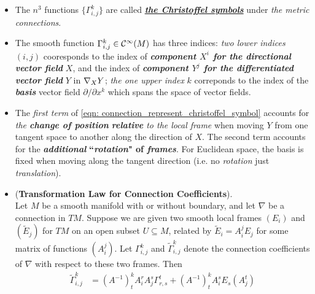 \documentclass[11pt]{article}
\begin{document}
\begin{itemize}
\item \begin{remark}
The $n^3$ functions $\{\Gamma_{i,j}^{k}\}$ are called \underline{\emph{\textbf{the Christoffel symbols}}} under \emph{the metric connections}. \citep{do1976differential}
\end{remark}

\item \begin{remark}
The smooth function $\Gamma_{i,j}^{k} \in {\mathcal C}^{\infty}(M)$ has three indices: \emph{two lower indices} $(i,j)$ cooresponds to the index of \emph{\textbf{component $X^i$ for the directional vector field}} $X$, and the index of \emph{\textbf{component $Y^j$ for the differentiated vector field}} $Y$ in $\nabla_{X}{Y}$;  \emph{the one upper index} $k$ correponds to the index of the \emph{\textbf{basis}} vector field $\partial/ \partial x^k$ which spans the space of vector fields. 
\end{remark}

\item \begin{remark}
The \emph{first term} of \eqref{eqn: connection_represent_christoffel_symbol} accounts for \emph{the \textbf{change of position} \textbf{relative} to the local frame} when moving $Y$ from one tangent space to another along the direction of $X$. The second term accounts for the \textbf{\emph{additional}} \textbf{``\emph{rotation}" of \emph{frames}}. For Euclidean space, the basis is fixed when moving along the tangent direction (i.e. no \emph{rotation} just \emph{translation}).
\end{remark}

\item \begin{proposition} (\textbf{Transformation Law for Connection Coefficients}).  \citep{lee2018introduction} \\
Let $M$ be a smooth manifold with or without boundary, and let $\nabla$ be a connection in $TM$. Suppose we are given two smooth local frames $(E_i)$ and $(\widetilde{E}_j)$ for $TM$ on an open subset $U \subseteq M$, related by $\widetilde{E}_i = A_i^j E_j$ for some matrix of functions $(A_i^j)$. Let $\Gamma_{i,j}^{k}$ and $\widetilde{\Gamma}_{i,j}^{k}$ denote the connection coefficients of $\nabla$ with respect to these two frames.
Then
\begin{align}
\widetilde{\Gamma}_{i,j}^{k} &= (A^{-1})_{t}^{k}A_{i}^{r}A_{j}^{s}\Gamma_{r,s}^{t}+ (A^{-1})_{t}^{k}A_{i}^{s}E_{s}(A_{j}^{t})  \label{eqn: chistoffel_symbol_change_of_basis}
\end{align}
\end{proposition}


\end{itemize}
\end{document}
